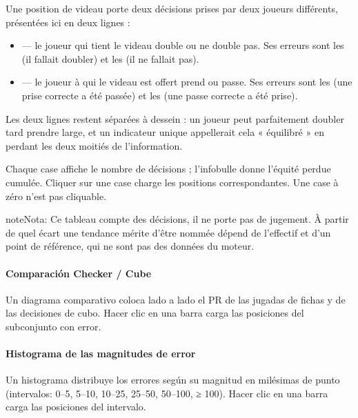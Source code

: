 \documentclass[letterpaper,10pt,spanish]{sphinxmanual}
\begin{document}
\sphinxAtStartPar
Une position de videau porte deux décisions prises par deux joueurs
différents, présentées ici en deux lignes :
\begin{itemize}
\item {} 
\sphinxAtStartPar
{} — le joueur qui tient le videau double ou ne double pas. Ses
erreurs sont les  (il fallait doubler) et les  (il ne fallait pas).

\item {} 
\sphinxAtStartPar
{} — le joueur à qui le videau est offert prend ou passe. Ses
erreurs sont les  (une prise correcte a été passée) et les
 (une passe correcte a été prise).

\end{itemize}

\sphinxAtStartPar
Les deux lignes restent séparées à dessein : un joueur peut parfaitement
doubler tard  prendre large, et un indicateur unique appellerait cela
« équilibré » en perdant les deux moitiés de l’information.

\sphinxAtStartPar
Chaque case affiche le nombre de décisions ; l’infobulle donne l’équité perdue
cumulée. Cliquer sur une case charge les positions correspondantes. Une case à
zéro n’est pas cliquable.

\begin{sphinxadmonition}{note}{Nota:}
\sphinxAtStartPar
Ce tableau compte des décisions, il ne porte pas de jugement. À partir de
quel écart une tendance mérite d’être nommée dépend de l’effectif et d’un
point de référence, qui ne sont pas des données du moteur.
\end{sphinxadmonition}


\paragraph{Comparación Checker / Cube}
\label{\detokenize{manuel:repartition-checker-cube}}
\sphinxAtStartPar
Un diagrama comparativo coloca lado a lado el PR de las jugadas de fichas y de las decisiones de cubo. Hacer clic en una barra carga las posiciones del subconjunto con error.


\paragraph{Histograma de las magnitudes de error}
\label{\detokenize{manuel:histogramme-des-magnitudes-d-erreur}}
\sphinxAtStartPar
Un histograma distribuye los errores según su magnitud en milésimas de punto (intervalos: 0–5, 5–10, 10–25, 25–50, 50–100, ≥ 100). Hacer clic en una barra carga las posiciones del intervalo.
\end{document}
